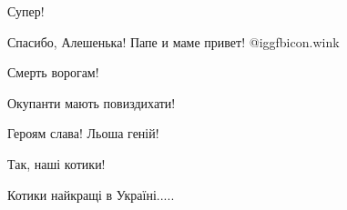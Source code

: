  
Супер!

 
Спасибо, Алешенька! Папе и маме привет!  @igg{fbicon.wink} 

 
Смерть ворогам!

 
Окупанти мають повиздихати!

 
Героям слава! Льоша геній!

 
Так, наші котики!

 
Котики найкращі в Україні.....

 
